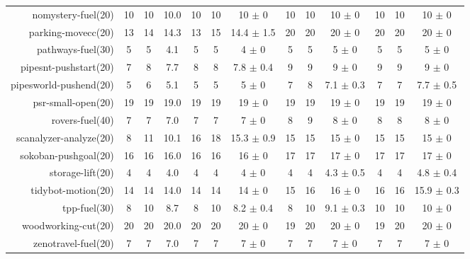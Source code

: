 \begin{center}
\begin{tabular}{|r|*{4}{ccc|}}
nomystery-fuel(20) & 10 & 10 & 10.0 & 10 & 10 & 10 \(\pm\) 0 & 10 & 10 & 10 \(\pm\) 0 & 10 & 10 & 10 \(\pm\) 0\\
parking-movecc(20) & 13 & 14 & 14.3 & 13 & 15 & 14.4 \(\pm\) 1.5 & 20 & 20 & 20 \(\pm\) 0 & 20 & 20 & 20 \(\pm\) 0\\
pathways-fuel(30) & 5 & 5 & 4.1 & 5 & 5 & 4 \(\pm\) 0 & 5 & 5 & 5 \(\pm\) 0 & 5 & 5 & 5 \(\pm\) 0\\
pipesnt-pushstart(20) & 7 & 8 & 7.7 & 8 & 8 & 7.8 \(\pm\) 0.4 & 9 & 9 & 9 \(\pm\) 0 & 9 & 9 & 9 \(\pm\) 0\\
pipesworld-pushend(20) & 5 & 6 & 5.1 & 5 & 5 & 5 \(\pm\) 0 & 7 & 8 & 7.1 \(\pm\) 0.3 & 7 & 7 & 7.7 \(\pm\) 0.5\\
psr-small-open(20) & 19 & 19 & 19.0 & 19 & 19 & 19 \(\pm\) 0 & 19 & 19 & 19 \(\pm\) 0 & 19 & 19 & 19 \(\pm\) 0\\
rovers-fuel(40) & 7 & 7 & 7.0 & 7 & 7 & 7 \(\pm\) 0 & 8 & 9 & 8 \(\pm\) 0 & 8 & 8 & 8 \(\pm\) 0\\
scanalyzer-analyze(20) & 8 & 11 & 10.1 & 16 & 18 & 15.3 \(\pm\) 0.9 & 15 & 15 & 15 \(\pm\) 0 & 15 & 15 & 15 \(\pm\) 0\\
sokoban-pushgoal(20) & 16 & 16 & 16.0 & 16 & 16 & 16 \(\pm\) 0 & 17 & 17 & 17 \(\pm\) 0 & 17 & 17 & 17 \(\pm\) 0\\
storage-lift(20) & 4 & 4 & 4.0 & 4 & 4 & 4 \(\pm\) 0 & 4 & 4 & 4.3 \(\pm\) 0.5 & 4 & 4 & 4.8 \(\pm\) 0.4\\
tidybot-motion(20) & 14 & 14 & 14.0 & 14 & 14 & 14 \(\pm\) 0 & 15 & 16 & 16 \(\pm\) 0 & 16 & 16 & 15.9 \(\pm\) 0.3\\
tpp-fuel(30) & 8 & 10 & 8.7 & 8 & 10 & 8.2 \(\pm\) 0.4 & 8 & 10 & 9.1 \(\pm\) 0.3 & 10 & 10 & 10 \(\pm\) 0\\
woodworking-cut(20) & 20 & 20 & 20.0 & 20 & 20 & 20 \(\pm\) 0 & 19 & 20 & 20 \(\pm\) 0 & 19 & 20 & 20 \(\pm\) 0\\
zenotravel-fuel(20) & 7 & 7 & 7.0 & 7 & 7 & 7 \(\pm\) 0 & 7 & 7 & 7 \(\pm\) 0 & 7 & 7 & 7 \(\pm\) 0\\
\end{tabular}
\end{center}
